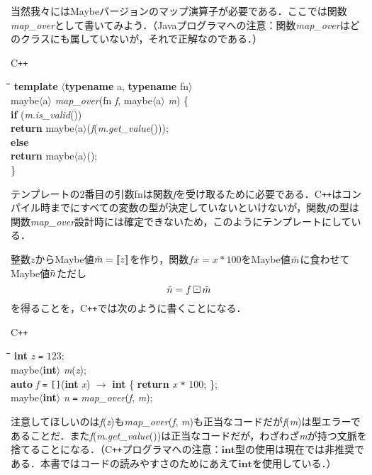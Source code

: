 \documentclass[twocolumn]{jsbook}
\def\[{\left[\!\left[}
\def\]{\right]\!\right]}
\newcommand{\programminglanguage}[1]{\textsf{#1}}
\newcommand{\cxx}{\programminglanguage{C}\texttt{++}}
\newenvironment{cxxcode}{\begin{itembox}[r]{\cxx}}{\end{itembox}}
\newenvironment{pythontab}{\begin{tabbing}\hspace*{1em}\=\hspace*{1em}\=\hspace*{1em}\=\hspace*{1em}\=\kill}{\end{tabbing}}
\newcommand{\pthnClassname}[1]{\textrm{#1}}
\newcommand{\pthnId}[1]{\textit{#1}}
\newcommand{\pthnKeyword}[1]{\textbf{#1}}
\newcommand{\pthnOp}[1]{\texttt{#1}}
\DeclareMathOperator{\hsklMaybeMap}{\boxdot}
\newcommand{\hsklJust}[1]{\[#1\]}
\newcommand{\hsklMaybe}[1]{\Tilde{#1}}
\begin{document}
当然我々にはMaybeバージョンのマップ演算子が必要である．ここでは関数\pthnId{map\_over}として書いてみよう．（Javaプログラマへの注意：関数\pthnId{map\_over}はどのクラスにも属していないが，それで正解なのである．）
\begin{cxxcode}
\begin{pythontab}
\pthnKeyword{template} $\langle$\pthnKeyword{typename} \pthnClassname{a}, \pthnKeyword{typename} \pthnClassname{fn}$\rangle$\\
\pthnClassname{maybe}$\langle$\pthnClassname{a}$\rangle$ \pthnId{map\_over}(\pthnClassname{fn} \pthnId{f}, \pthnClassname{maybe}$\langle$\pthnClassname{a}$\rangle$ \pthnId{m}) \{\\
\>\pthnKeyword{if} (\pthnId{m}.\pthnId{is\_valid}())\\
\>\>\pthnKeyword{return} \pthnClassname{maybe}$\langle$\pthnClassname{a}$\rangle$(\pthnId{f}(\pthnId{m}.\pthnId{get\_value}()));\\
\>\pthnKeyword{else}\\
\>\>\pthnKeyword{return} \pthnClassname{maybe}$\langle$\pthnClassname{a}$\rangle$();\\
\}
\end{pythontab}
\end{cxxcode}
テンプレートの2番目の引数\pthnClassname{fn}は関数\pthnId{f}を受け取るために必要である．\cxx はコンパイル時までにすべての変数の型が決定していないといけないが，関数\pthnId{f}の型は関数\pthnId{map\_over}設計時には確定できないため，このようにテンプレートにしている．

整数$z$からMaybe値$\hsklMaybe{m}=\hsklJust{z}$を作り，関数$fx=x*100$をMaybe値$\hsklMaybe{m}$に食わせてMaybe値$\hsklMaybe{n}$ただし$$\hsklMaybe{n}=f\hsklMaybeMap\hsklMaybe{m}$$を得ることを，\cxx では次のように書くことになる．
\begin{cxxcode}
\begin{pythontab}
\pthnKeyword{int} \pthnId{z} \pthnOp{=} $123$;\\
\pthnClassname{maybe}$\langle$\pthnKeyword{int}$\rangle$ \pthnId{m}(\pthnId{z});\\
\pthnKeyword{auto} \pthnId{f} \pthnOp{=} \pthnOp{[]}(\pthnKeyword{int} \pthnId{x}) $\rightarrow$ \pthnKeyword{int} \{ \pthnKeyword{return} \pthnId{x} \pthnOp{*} $100$; \};\\
\pthnClassname{maybe}$\langle$\pthnKeyword{int}$\rangle$ \pthnId{n} \pthnOp{=} \pthnId{map\_over}(\pthnId{f}, \pthnId{m});
\end{pythontab}
\end{cxxcode}
注意してほしいのは\pthnId{f}(\pthnId{z})も\pthnId{map\_over}(\pthnId{f}, \pthnId{m})も正当なコードだが\pthnId{f}(\pthnId{m})は型エラーであることだ．また\pthnId{f}(\pthnId{m}.\pthnId{get\_value}())は正当なコードだが，わざわざ\pthnId{m}が持つ文脈を捨てることになる．（\cxx プログラマへの注意：$\pthnKeyword{int}$型の使用は現在では非推奨である．本書ではコードの読みやすさのためにあえて$\pthnKeyword{int}$を使用している．）
\end{document}
